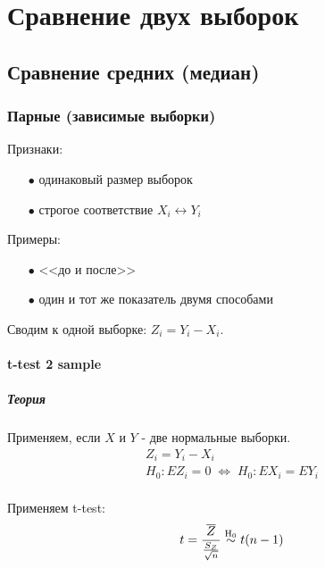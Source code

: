 \chapter{Сравнение двух выборок}\label{cha:2sample}

\section{Сравнение средних (медиан)}\label{cha:2sample/sec:mo}

\subsection{Парные (зависимые выборки)}\label{cha:2sample/sec:mo/subsec:pair}

Признаки:
\begin{itemize}
	\item[$\bullet$] одинаковый размер выборок
	\item[$\bullet$] строгое соответствие $X_i \leftrightarrow Y_i$
\end{itemize}
Примеры:
\begin{itemize}
	\item[$\bullet$] <<до и после>>
	\item[$\bullet$] один и тот же показатель двумя способами
\end{itemize}

Сводим к одной выборке: $Z_i = Y_i - X_i$.

	\subsubsection{t-test 2 sample}\label{cha:2sample/sec:mo/subsec:pair/subsubsec:ttest}

		\paragraph*{Теория}\label{cha:2sample/sec:mo/subsec:pair/subsubsec:ttest/par:theory}

		Применяем, если $X$ и $Y$ - две нормальные выборки.\\

		$$\begin{gathered}
			Z_i = Y_i - X_i \\
			H_0: E Z_i = 0 \; \Leftrightarrow \; H_0: E X_i = E Y_i\\
		\end{gathered}$$

		Применяем t-test:
		$$t = \frac{\overline{Z}}{\frac{S_Z}{\sqrt{n}}} \mathrel{\stackrel{\rm H_0}\sim} t(n-1)$$

